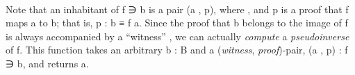 \begin{code}
\>[1]\AgdaSpace{}%
\AgdaSymbol{:}%
\>[72I]\AgdaSymbol{\{}\AgdaSpace{}%
\AgdaSymbol{:}\AgdaSpace{}%
\AgdaSpace{}%
\AgdaSymbol{\}\{}\AgdaSpace{}%
\AgdaSymbol{:}\AgdaSpace{}%
\AgdaSpace{}%
\AgdaSymbol{\}(}\AgdaSpace{}%
\AgdaSymbol{:}\AgdaSpace{}%
\AgdaSpace{}%
\AgdaSpace{}%
\AgdaSymbol{)(}\AgdaSpace{}%
\AgdaSymbol{:}\AgdaSpace{}%
\AgdaSymbol{)(}\AgdaSpace{}%
\AgdaSymbol{:}\AgdaSpace{}%
\AgdaSymbol{)}\AgdaSpace{}%
\AgdaSpace{}%
\AgdaSpace{}%
\AgdaSpace{}%
\AgdaSpace{}%
\AgdaSpace{}%
\AgdaSpace{}%
\AgdaSpace{}%
\AgdaSpace{}%
\AgdaSpace{}%
\<%
\\
%
\>[1]\AgdaSpace{}%
\AgdaSpace{}%
\AgdaSpace{}%
\AgdaSpace{}%
\AgdaSpace{}%
\AgdaSymbol{=}\AgdaSpace{}%
\AgdaSpace{}%
\AgdaSpace{}%
\AgdaSpace{}%
\<%
\end{code}
\ccpad
Note that an inhabitant of  \ab f \af ∋ \ab b is a pair (\ab a , \ab p), where , and \ab p is a proof that \ab f maps \ab a to \ab b; that is, \ab p \as : \ab b \ad ≡ \ab f \ab a. Since the proof that \ab b belongs to the image of \ab f is always accompanied by a ``witness'' , we can actually \emph{compute} a \emph{pseudoinverse} of \ab f. This function takes an arbitrary \ab b \as : \ab B and a (\textit{witness}, \textit{proof})-pair, (\ab a , \ab p) \as :  \ab f \af ∋ \ab b, and returns \ab a.
\ccpad
